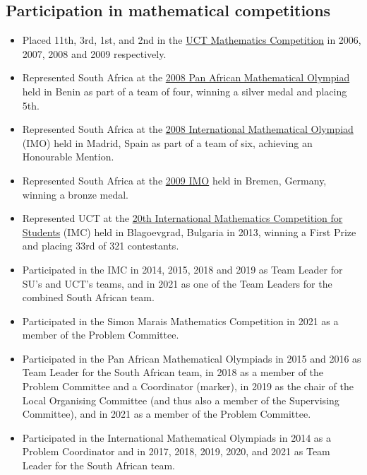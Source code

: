\documentclass{article}
\begin{document}
\subsection{Participation in mathematical competitions}
\begin{itemize}
	\item Placed 11th, 3rd, 1st, and 2nd in the \href{http://www.mth.uct.ac.za/competition/}{UCT Mathematics Competition} in 2006, 2007, 2008 and 2009 respectively.
	\item Represented South Africa at the \href{http://www.pamo-official.org/en/opam_infos_annee.php?annee=2008&edition=18}{2008 Pan African Mathematical Olympiad} held in Benin as part of a team of four, winning a silver medal and placing 5th.
	\item Represented South Africa at the \href{http://www.imo-2008.es/}{2008 International Mathematical Olympiad} (IMO) held in Madrid, Spain as part of a team of six, achieving an Honourable Mention.
	\item Represented South Africa at the \href{http://www.imo-official.org/year_info.aspx?year=2009}{2009 IMO} held in Bremen, Germany, winning a bronze medal.
	\item Represented UCT at the \href{http://www.imc-math.org.uk/index.php?year=2013}{20th International Mathematics Competition for Students} (IMC) held in Blagoevgrad, Bulgaria in 2013, winning a First Prize and placing 33rd of 321 contestants.
	\item Participated in the IMC in 2014, 2015, 2018 and 2019 as Team Leader for SU's and UCT's teams, and in 2021 as one of the Team Leaders for the combined South African team.
	\item Participated in the Simon Marais Mathematics Competition in 2021 as a member of the Problem Committee.
	\item Participated in the Pan African Mathematical Olympiads in 2015 and 2016 as Team Leader for the South African team, in 2018 as a member of the Problem Committee and a Coordinator (marker), in 2019 as the chair of the Local Organising Committee (and thus also a member of the Supervising Committee), and in 2021 as a member of the Problem Committee.
	\item Participated in the International Mathematical Olympiads in 2014 as a Problem Coordinator and in 2017, 2018, 2019, 2020, and 2021 as Team Leader for the South African team.
\end{itemize}

\newpage
\end{document}
